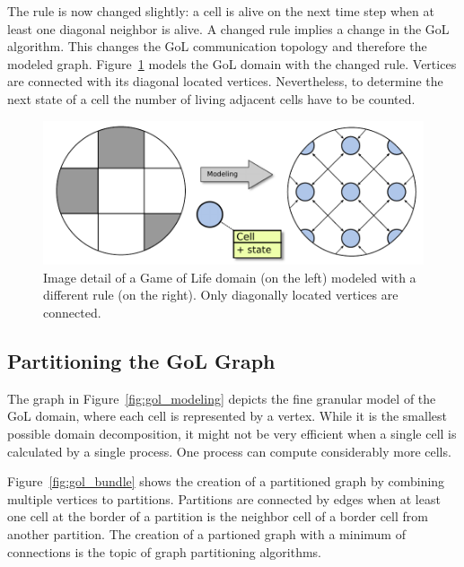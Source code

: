\noindent The rule is now changed slightly: a cell is alive on the next time
step when at least one diagonal neighbor is alive.  A changed rule
 implies a change in the GoL algorithm.  This changes the GoL
communication topology and therefore the modeled
graph. Figure~\ref{fig:gol_modeling_changed} models the GoL domain
with the changed rule. Vertices are connected with its diagonal
located vertices. Nevertheless, to determine the next state of a cell
the number of living adjacent cells have to be counted.

\begin{figure}[H]
  \centering \includegraphics[width=\textwidth]{graphics/30_gol_modeling_changed}
  \caption{Image detail of a Game of Life domain (on the left)
    modeled with a different rule (on the right). Only diagonally located
    vertices are connected.}
  \label{fig:gol_modeling_changed}
\end{figure}


\subsection{Partitioning the GoL Graph}
The graph in Figure~\ref{fig:gol_modeling} depicts the fine granular
model of the GoL domain, where each cell is represented by a vertex.
While it is the smallest possible domain decomposition, it might not
be very efficient when a single cell is calculated by a single
process. One process can compute considerably more cells.

Figure~\ref{fig:gol_bundle} shows the creation of a partitioned graph
by combining multiple vertices to partitions. Partitions are connected
by edges when at least one cell at the border of a partition is the
neighbor cell of a border cell from another partition.  The creation
of a partioned graph with a minimum of connections is the topic of
graph partitioning algorithms.

